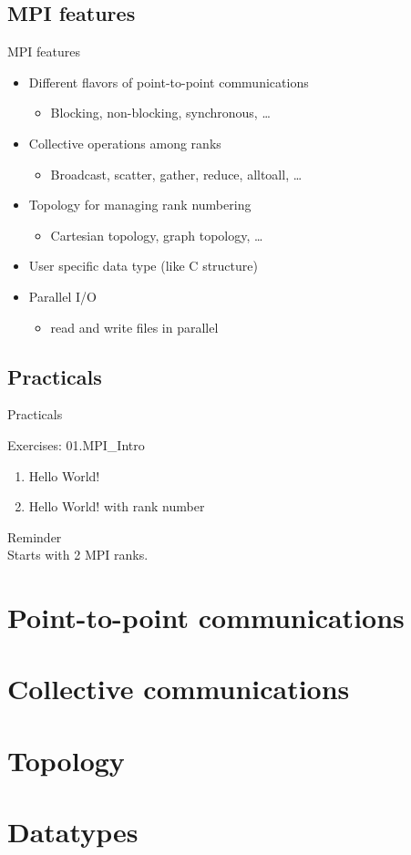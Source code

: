 \documentclass[aspectratio=43]{beamer}
\begin{document}
\subsection{MPI features}
\begin{frame}{MPI features}
\begin{itemize}
    \item Different flavors of point-to-point communications
    \begin{itemize}
        \item Blocking, non-blocking, synchronous, \ldots
    \end{itemize}
    \item Collective operations among ranks
    \begin{itemize}
        \item Broadcast, scatter, gather, reduce, alltoall, \ldots
    \end{itemize}
    \item Topology for managing rank numbering
    \begin{itemize}
        \item Cartesian topology, graph topology, \ldots
    \end{itemize}
    \item User specific data type (like C structure)
    \item Parallel I/O
    \begin{itemize}
        \item read and write files in parallel
    \end{itemize}
\end{itemize}
\end{frame}

\subsection{Practicals}
\begin{frame}{Practicals}
    \begin{brown2block}{Exercises: 01.MPI\_Intro}
    \begin{enumerate}
    \item Hello World!
    \item Hello World! with rank number
    \end{enumerate}
    \end{brown2block}
    \begin{brown0block}{Reminder}
        \\
        Starts with 2 MPI ranks.
    \end{brown0block}
\end{frame}

\section{Point-to-point communications}
\section{Collective communications}
\section{Topology}
\section{Datatypes}

\end{document}
